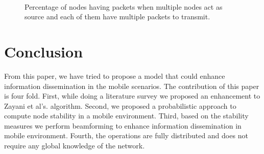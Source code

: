 \documentclass[preprint, twocolumn,5p]{elsarticle}
\begin{document}
    \begin{figure*}
        \centering
        \mbox
        {
            \hspace{1cm}
        }
        \mbox
        {
            \hspace{1cm}
        }
        \mbox
        {
            \hspace{1cm}
        }
        \mbox
        {
            \hspace{1cm}
        }
        \caption{Percentage of nodes having packets when multiple nodes act as source and each of them have multiple packets to transmit.}
        \label{fig:results2}
    \end{figure*}

\section{Conclusion}\label{sec:conclusion}
From this paper, we have tried to propose a model that could enhance information dissemination in the mobile scenarios. The contribution of this paper is four fold. First, while doing a literature survey we proposed an enhancement to Zayani et al's. algorithm. Second, we proposed a probabilistic approach to compute node stability in a mobile environment. Third, based on the stability measures we perform beamforming to enhance information dissemination in mobile environment. Fourth, the operations are fully distributed and does not require any global knowledge of the network.
\end{document}
